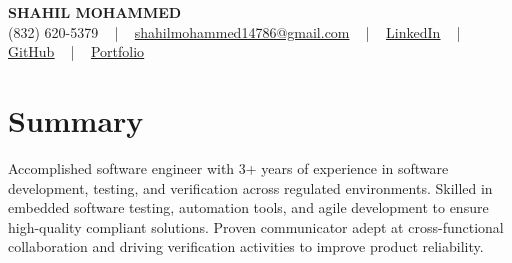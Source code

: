 \documentclass[letterpaper,10pt]{article}
\begin{document}
\begin{center}
    {\fontsize{14pt}{12pt}\selectfont \textbf{\MakeUppercase{Shahil Mohammed}}}\\ \vspace{2pt}
    \fontsize{10pt}{12pt}\selectfont (832) 620-5379 ~ | ~ \href{mailto:shahilmohammed14786@gmail.com}{shahilmohammed14786@gmail.com} ~ | ~  
    \href{https://www.linkedin.com/in/shahil-mohammed-9652931a1/}{\color{blue}\underline{LinkedIn}}  ~ | ~ 
    \href{https://github.com/freakbeast14}{\color{blue}\underline{GitHub}} ~ | ~ 
    \href{https://shahil-mohammed.netlify.app/}{\color{blue}\underline{Portfolio}}
    \vspace{-8pt}
\end{center}

\section{Summary}
\vspace{-2pt}\fontsize{8pt}{9pt}\selectfont
Accomplished software engineer with 3+ years of experience in software development, testing, and verification across regulated environments. Skilled in embedded software testing, automation tools, and agile development to ensure high-quality compliant solutions. Proven communicator adept at cross-functional collaboration and driving verification activities to improve product reliability.
 \vspace{-5pt}
 
\vspace{-2pt}
\end{document}
